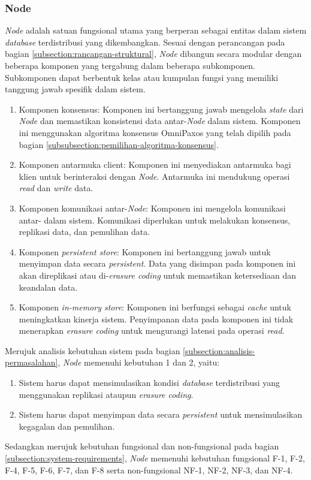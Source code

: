 \subsubsection{Node}
\label{subsubsection:node}

\textit{Node} adalah satuan fungsional utama yang berperan sebagai entitas dalam sistem \textit{database} terdistribusi yang dikembangkan. Sesuai dengan perancangan pada bagian \ref{subsection:rancangan-struktural}, \textit{Node} dibangun secara modular dengan beberapa komponen yang tergabung dalam beberapa subkomponen. Subkomponen dapat berbentuk kelas atau kumpulan fungsi yang memiliki tanggung jawab spesifik dalam sistem.

\begin{enumerate}
    \item Komponen konsensus: Komponen ini bertanggung jawab mengelola \textit{state} dari \textit{Node} dan memastikan konsistensi data antar-\textit{Node} dalam sistem. Komponen ini menggunakan algoritma konsensus OmniPaxos yang telah dipilih pada bagian \ref{subsubsection:pemilihan-algoritma-konsensus}.
    \item Komponen antarmuka client: Komponen ini menyediakan antarmuka bagi klien untuk berinteraksi dengan \textit{Node}. Antarmuka ini mendukung operasi \textit{read} dan \textit{write} data.
    \item Komponen komunikasi antar-\textit{Node}: Komponen ini mengelola komunikasi antar- dalam sistem. Komunikasi diperlukan untuk melakukan konsensus, replikasi data, dan pemulihan data.
    \item Komponen \textit{persistent store}: Komponen ini bertanggung jawab untuk menyimpan data secara \textit{persistent}. Data yang disimpan pada komponen ini akan direplikasi atau di-\textit{erasure coding} untuk memastikan ketersediaan dan keandalan data.
    \item Komponen \textit{in-memory store}: Komponen ini berfungsi sebagai \textit{cache} untuk meningkatkan kinerja sistem. Penyimpanan data pada komponen ini tidak menerapkan \textit{erasure coding} untuk mengurangi latensi pada operasi \textit{read}.
\end{enumerate}

Merujuk analisis kebutuhan sistem pada bagian \ref{subsection:analisis-permasalahan}, \textit{Node} memenuhi kebutuhan 1 dan 2, yaitu:

\begin{enumerate}
    \item Sistem harus dapat mensimulasikan kondisi \textit{database} terdistribusi yang menggunakan replikasi ataupun \textit{erasure coding}.
    \item Sistem harus dapat menyimpan data secara \textit{persistent} untuk mensimulasikan kegagalan dan pemulihan.
\end{enumerate}

Sedangkan merujuk kebutuhan fungsional dan non-fungsional pada bagian \ref{subsection:system-requirements}, \textit{Node} memenuhi kebutuhan fungsional F-1, F-2, F-4, F-5, F-6, F-7, dan F-8 serta non-fungsional NF-1, NF-2, NF-3, dan NF-4.

